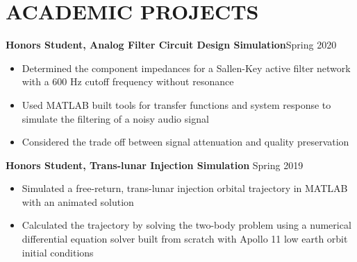 \documentclass{article}
\begin{document}
\section{ACADEMIC PROJECTS}

\textbf{Honors Student, Analog Filter Circuit Design Simulation}\hfill Spring 2020
\vspace{0.5em}
\begin{itemize}
	\item Determined the component impedances for a Sallen-Key active filter network with a 600 Hz cutoff frequency without resonance
	\item Used MATLAB built tools for transfer functions and system response to simulate the filtering of a noisy audio signal
	\item Considered the trade off between signal attenuation and quality preservation
\end{itemize}
\vspace{0.5em}
\textbf{Honors Student, Trans-lunar Injection Simulation} 
\hfill
Spring 2019
\vspace{0.5em}
\begin{itemize}
	\item Simulated a free-return, trans-lunar injection orbital trajectory in MATLAB with an animated solution
	\item Calculated the trajectory by solving the two-body problem using a numerical differential equation solver built from scratch with Apollo 11 low earth orbit initial conditions
\end{itemize}

\thispagestyle{empty}
\end{document}
